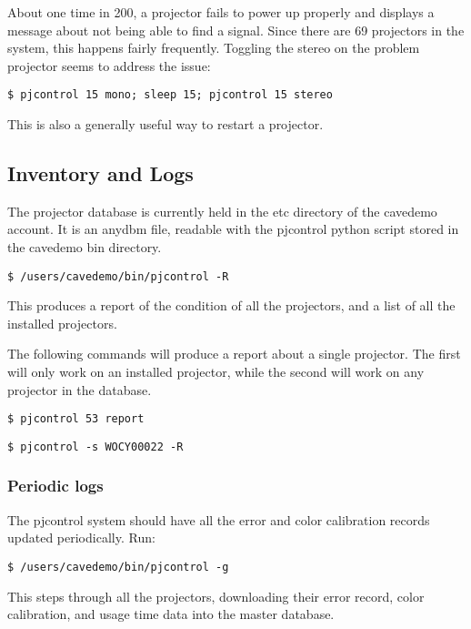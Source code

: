 \documentclass[11pt]{article}
\begin{document}
About one time in 200, a projector fails to power up properly and
displays a message about not being able to find a signal.  Since
there are 69 projectors in the system, this happens fairly
frequently.  Toggling the stereo on the problem projector seems to
address the issue:

\begin{verbatim}
$ pjcontrol 15 mono; sleep 15; pjcontrol 15 stereo
\end{verbatim}

This is also a generally useful way to restart a projector.

\subsection{Inventory and Logs}
\label{logging}

The projector database is currently held in the etc directory of the
cavedemo account.  It is an anydbm file, readable with the pjcontrol
python script stored in the cavedemo bin directory.

\begin{verbatim}
$ /users/cavedemo/bin/pjcontrol -R
\end{verbatim}

This produces a report of the condition of all the projectors, and a
list of all the installed projectors.

The following commands will produce a report about a single
projector.  The first will only work on an installed projector, while
the second will work on any projector in the database.

\begin{verbatim}
$ pjcontrol 53 report
\end{verbatim}

\begin{verbatim}
$ pjcontrol -s WOCY00022 -R
\end{verbatim}

\subsubsection{Periodic logs}

The pjcontrol system should have all the error and color calibration
records updated periodically.  Run:

\begin{verbatim}
$ /users/cavedemo/bin/pjcontrol -g
\end{verbatim}

This steps through all the projectors, downloading their error
record, color calibration, and usage time data into the master
database.
\end{document}
